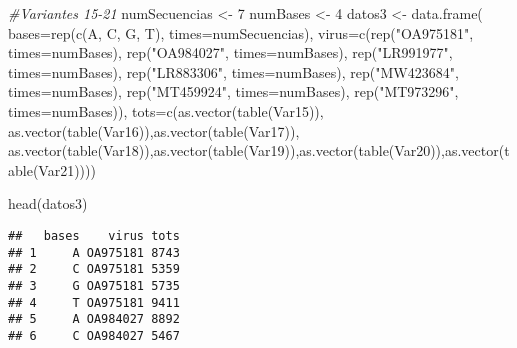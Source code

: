 \documentclass[
]{article}
\newenvironment{Shaded}{\begin{snugshade}}{\end{snugshade}}
\newcommand{\AttributeTok}[1]{\textcolor[rgb]{0.77,0.63,0.00}{#1}}
\newcommand{\CommentTok}[1]{\textcolor[rgb]{0.56,0.35,0.01}{\textit{#1}}}
\newcommand{\DecValTok}[1]{\textcolor[rgb]{0.00,0.00,0.81}{#1}}
\newcommand{\FunctionTok}[1]{\textcolor[rgb]{0.00,0.00,0.00}{#1}}
\newcommand{\NormalTok}[1]{#1}
\newcommand{\OtherTok}[1]{\textcolor[rgb]{0.56,0.35,0.01}{#1}}
\newcommand{\StringTok}[1]{\textcolor[rgb]{0.31,0.60,0.02}{#1}}
\begin{document}
\begin{Shaded}
\begin{Highlighting}[]
\CommentTok{\#Variantes 15{-}21}
\NormalTok{numSecuencias }\OtherTok{\textless{}{-}} \DecValTok{7}
\NormalTok{numBases }\OtherTok{\textless{}{-}} \DecValTok{4}
\NormalTok{datos3 }\OtherTok{\textless{}{-}} \FunctionTok{data.frame}\NormalTok{( }\AttributeTok{bases=}\FunctionTok{rep}\NormalTok{(}\FunctionTok{c}\NormalTok{(}\StringTok{\textquotesingle{}A\textquotesingle{}}\NormalTok{, }\StringTok{\textquotesingle{}C\textquotesingle{}}\NormalTok{, }\StringTok{\textquotesingle{}G\textquotesingle{}}\NormalTok{, }\StringTok{\textquotesingle{}T\textquotesingle{}}\NormalTok{), }\AttributeTok{times=}\NormalTok{numSecuencias),}
                     \AttributeTok{virus=}\FunctionTok{c}\NormalTok{(}\FunctionTok{rep}\NormalTok{(}\StringTok{"OA975181"}\NormalTok{, }\AttributeTok{times=}\NormalTok{numBases),}
                     \FunctionTok{rep}\NormalTok{(}\StringTok{"OA984027"}\NormalTok{, }\AttributeTok{times=}\NormalTok{numBases),}
                     \FunctionTok{rep}\NormalTok{(}\StringTok{"LR991977"}\NormalTok{, }\AttributeTok{times=}\NormalTok{numBases),}
                     \FunctionTok{rep}\NormalTok{(}\StringTok{"LR883306"}\NormalTok{, }\AttributeTok{times=}\NormalTok{numBases),}
                     \FunctionTok{rep}\NormalTok{(}\StringTok{"MW423684"}\NormalTok{, }\AttributeTok{times=}\NormalTok{numBases),}
                     \FunctionTok{rep}\NormalTok{(}\StringTok{"MT459924"}\NormalTok{, }\AttributeTok{times=}\NormalTok{numBases),}
                     \FunctionTok{rep}\NormalTok{(}\StringTok{"MT973296"}\NormalTok{, }\AttributeTok{times=}\NormalTok{numBases)),}
                     \AttributeTok{tots=}\FunctionTok{c}\NormalTok{(}\FunctionTok{as.vector}\NormalTok{(}\FunctionTok{table}\NormalTok{(Var15)), }\FunctionTok{as.vector}\NormalTok{(}\FunctionTok{table}\NormalTok{(Var16)),}\FunctionTok{as.vector}\NormalTok{(}\FunctionTok{table}\NormalTok{(Var17)),}
                     \FunctionTok{as.vector}\NormalTok{(}\FunctionTok{table}\NormalTok{(Var18)),}\FunctionTok{as.vector}\NormalTok{(}\FunctionTok{table}\NormalTok{(Var19)),}\FunctionTok{as.vector}\NormalTok{(}\FunctionTok{table}\NormalTok{(Var20)),}\FunctionTok{as.vector}\NormalTok{(}\FunctionTok{table}\NormalTok{(Var21))))}

\FunctionTok{head}\NormalTok{(datos3)}
\end{Highlighting}
\end{Shaded}

\begin{verbatim}
##   bases    virus tots
## 1     A OA975181 8743
## 2     C OA975181 5359
## 3     G OA975181 5735
## 4     T OA975181 9411
## 5     A OA984027 8892
## 6     C OA984027 5467
\end{verbatim}
\end{document}
